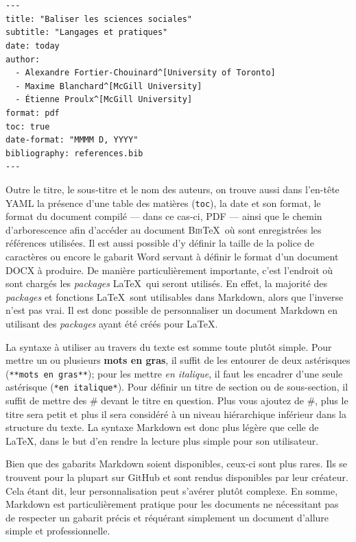 \documentclass[
  letterpaper,
]{scrbook}
\begin{document}

\hypertarget{section}{%
\chapter{}\label{section}}

\begin{verbatim}
---
title: "Baliser les sciences sociales"
subtitle: "Langages et pratiques"
date: today
author:
  - Alexandre Fortier-Chouinard^[University of Toronto]
  - Maxime Blanchard^[McGill University]
  - Étienne Proulx^[McGill University]
format: pdf
toc: true
date-format: "MMMM D, YYYY"
bibliography: references.bib
---
\end{verbatim}

Outre le titre, le sous-titre et le nom des auteurs, on trouve aussi
dans l'en-tête YAML la présence d'une table des matières (\texttt{toc}),
la date et son format, le format du document compilé --- dans ce cas-ci,
PDF --- ainsi que le chemin d'arborescence afin d'accéder au document
\textsc{Bib}\TeX~où sont enregistrées les références utilisées. Il est
aussi possible d'y définir la taille de la police de caractères ou
encore le gabarit Word servant à définir le format d'un document DOCX à
produire. De manière particulièrement importante, c'est l'endroit où
sont chargés les \emph{packages} \LaTeX~qui seront utilisés. En effet,
la majorité des \emph{packages} et fonctions \LaTeX~sont utilisables
dans Markdown, alors que l'inverse n'est pas vrai. Il est donc possible
de personnaliser un document Markdown en utilisant des \emph{packages}
ayant été créés pour \LaTeX.

La syntaxe à utiliser au travers du texte est somme toute plutôt simple.
Pour mettre un ou plusieurs \textbf{mots en gras}, il suffit de les
entourer de deux astérisques (\texttt{**mots\ en\ gras**}); pour les
mettre \emph{en italique}, il faut les encadrer d'une seule astérisque
(\texttt{*en\ italique*}). Pour définir un titre de section ou de
sous-section, il suffit de mettre des \# devant le titre en question.
Plus vous ajoutez de \#, plus le titre sera petit et plus il sera
considéré à un niveau hiérarchique inférieur dans la structure du texte.
La syntaxe Markdown est donc plus légère que celle de \LaTeX, dans le
but d'en rendre la lecture plus simple pour son utilisateur.

Bien que des gabarits Markdown soient disponibles, ceux-ci sont plus
rares. Ils se trouvent pour la plupart sur GitHub et sont rendus
disponibles par leur créateur. Cela étant dit, leur personnalisation
peut s'avérer plutôt complexe. En somme, Markdown est particulièrement
pratique pour les documents ne nécessitant pas de respecter un gabarit
précis et réquérant simplement un document d'allure simple et
professionnelle.
\end{document}
